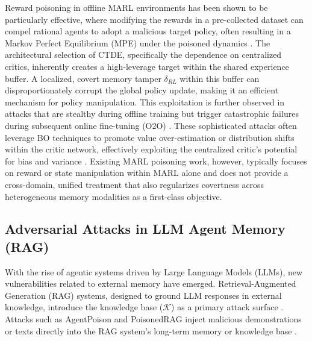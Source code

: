 \documentclass[conference]{IEEEtran}
\begin{document}
Reward poisoning in offline MARL environments has been shown to be particularly effective, where modifying the rewards in a pre-collected dataset can compel rational agents to adopt a malicious target policy, often resulting in a Markov Perfect Equilibrium (MPE) under the poisoned dynamics \cite{Ref12, Ref28}. The architectural selection of CTDE, specifically the dependence on centralized critics, inherently creates a high-leverage target within the shared experience buffer. A localized, covert memory tamper $\delta_{RL}$ within this buffer can disproportionately corrupt the global policy update, making it an efficient mechanism for policy manipulation. This exploitation is further observed in attacks that are stealthy during offline training but trigger catastrophic failures during subsequent online fine-tuning (O2O) \cite{Ref13, Ref25}. These sophisticated attacks often leverage BO techniques to promote value over-estimation or distribution shifts within the critic network, effectively exploiting the centralized critic's potential for bias and variance \cite{Ref6, Ref25}. Existing MARL poisoning work, however, typically focuses on reward or state manipulation within MARL alone and does not provide a cross-domain, unified treatment that also regularizes covertness across heterogeneous memory modalities as a first-class objective.

\subsection{Adversarial Attacks in LLM Agent Memory (RAG)}
With the rise of agentic systems driven by Large Language Models (LLMs), new vulnerabilities related to external memory have emerged. Retrieval-Augmented Generation (RAG) systems, designed to ground LLM responses in external knowledge, introduce the knowledge base ($\mathcal{K}$) as a primary attack surface \cite{Ref14, Ref15}. Attacks such as AgentPoison and PoisonedRAG inject malicious demonstrations or texts directly into the RAG system's long-term memory or knowledge base \cite{Ref7, Ref14}.
\end{document}

